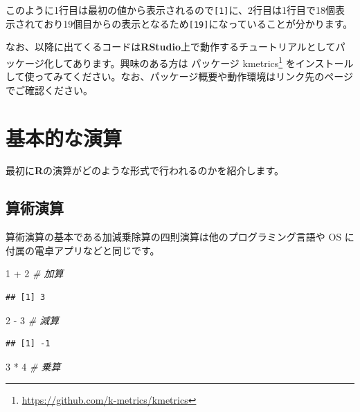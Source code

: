 \documentclass[
  12pt,
]{book}
\newenvironment{Shaded}{\begin{snugshade}}{\end{snugshade}}
\newcommand{\CommentTok}[1]{\textcolor[rgb]{0.56,0.35,0.01}{\textit{#1}}}
\newcommand{\DecValTok}[1]{\textcolor[rgb]{0.00,0.00,0.81}{#1}}
\newcommand{\SpecialCharTok}[1]{\textcolor[rgb]{0.00,0.00,0.00}{#1}}
\DeclareRobustCommand{\href}[2]{#2\footnote{\url{#1}}}
\begin{document}
このように1行目は最初の値から表示されるので\texttt{{[}1{]}}に、2行目は1行目で18個表示されており19個目からの表示となるため\texttt{{[}19{]}}になっていることが分かります。

なお、以降に出てくるコードは\textbf{RStudio}上で動作するチュートリアルとしてパッケージ化してあります。興味のある方は \href{https://github.com/k-metrics/kmetrics}{パッケージ kmetrics} をインストールして使ってみてください。なお、パッケージ概要や動作環境はリンク先のページでご確認ください。

\hypertarget{ux57faux672cux7684ux306aux6f14ux7b97}{%
\section{基本的な演算}\label{ux57faux672cux7684ux306aux6f14ux7b97}}

最初に\textbf{R}の演算がどのような形式で行われるのかを紹介します。

\hypertarget{ux7b97ux8853ux6f14ux7b97}{%
\subsection{算術演算}\label{ux7b97ux8853ux6f14ux7b97}}

算術演算の基本である加減乗除算の四則演算は他のプログラミング言語や OS に付属の電卓アプリなどと同じです。

\begin{Shaded}
\begin{Highlighting}[]
\DecValTok{1} \SpecialCharTok{+} \DecValTok{2}     \CommentTok{\# 加算}
\end{Highlighting}
\end{Shaded}

\begin{verbatim}
## [1] 3
\end{verbatim}

\begin{Shaded}
\begin{Highlighting}[]
\DecValTok{2} \SpecialCharTok{{-}} \DecValTok{3}     \CommentTok{\# 減算}
\end{Highlighting}
\end{Shaded}

\begin{verbatim}
## [1] -1
\end{verbatim}

\begin{Shaded}
\begin{Highlighting}[]
\DecValTok{3} \SpecialCharTok{*} \DecValTok{4}     \CommentTok{\# 乗算}
\end{Highlighting}
\end{Shaded}
\end{document}
